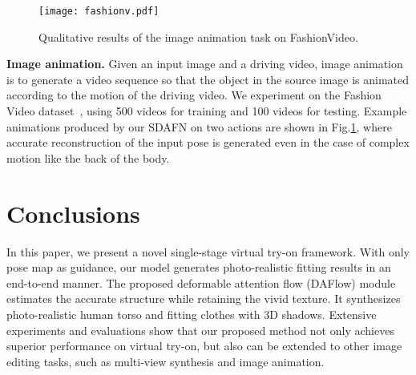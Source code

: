 \documentclass[runningheads]{llncs}
\begin{document}
\begin{figure}[t]
\centering
\texttt{[image: fashionv.pdf]}

   \caption{Qualitative results of the image animation task on FashionVideo.\label{fashionv}}

\end{figure}

\textbf{Image animation.}
Given an input image and a driving video, image animation is to generate a video sequence so that the object in the source image is animated according to the motion of the driving video. We experiment on the Fashion Video dataset~\cite{zablotskaia2019dwnet}, using 500 videos for training and 100 videos for testing. Example animations produced by our SDAFN on two actions are shown in Fig.\ref{fashionv}, where accurate reconstruction of the input pose is generated even in the case of complex motion like the back of the body.



\section{Conclusions}
In this paper, we present a novel single-stage virtual try-on framework. With only pose map as guidance, our model generates photo-realistic fitting results in an end-to-end manner. The proposed deformable attention flow (DAFlow) module estimates the accurate structure while retaining the vivid texture. It synthesizes photo-realistic human torso and fitting clothes with 3D shadows. Extensive experiments and evaluations show that our proposed method not only achieves superior performance on virtual try-on, but also can be extended to other image editing tasks, such as multi-view synthesis and image animation.
\clearpage


\end{document}
